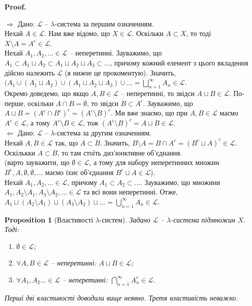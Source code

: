 \documentclass[a4paper, 10pt]{article}
\makeatletter
\def\rightproof{$\boxed{\Rightarrow}$ }
\def\leftproof{$\boxed{\Leftarrow}$ }
\theoremstyle{theoremdd}
\newtheorem{proposition}[theorem]{Proposition}
\renewenvironment{proof}[1][Proof.\\]{\par
\pushQED{\hfill \qed}%
\normalfont \topsep6\p@\@plus6\p@\relax
\trivlist
\item\relax
{\bfseries
#1\@addpunct{.}}\hspace\labelsep\ignorespaces
}{%
\popQED\endtrivlist\@endpefalse
}
\makeatother
\begin{document}
\begin{proof}
\rightproof Дано: $\mathcal{L}$ -- $\lambda$-система за першим означенням.\\
Нехай $A \in \mathcal{L}$. Нам вже відомо, що $X \in \mathcal{L}$. Оскільки $A \subset X$, то тоді $X \setminus A = A^c \in \mathcal{L}$.\\
Нехай $A_1,A_2,\dots \in \mathcal{L}$ -- неперетинні. Зауважимо, що $A_1 \subset A_1 \sqcup A_2 \subset A_1 \sqcup A_2 \sqcup A_3 \subset \dots$, причому кожний елемент з цього вкладення дійсно належить $\mathcal{L}$ (я нижче це прокоментую). Значить, $(A_1 \cup (A_1 \sqcup A_2) \cup (A_1 \sqcup A_2 \sqcup A_3) \cup \dots = \displaystyle\bigsqcup_{n=1}^\infty A_n \in \mathcal{L}$.
\bigskip \\
Окремо доведемо, що якщо $A,B \in \mathcal{L}$ -- неперетинні, то звідси $A \sqcup B \in \mathcal{L}$. По-перше, оскільки $A \cap B = \emptyset$, то звідси $B \subset A^c$. Зауважимо, що $A \sqcup B = (A^c \cap B^c)^c = (A^c \setminus B)^c$. Ми вже знаємо, що при $A,B \in \mathcal{L}$ маємо $A^c \in \mathcal{L}$, а тому $A^c \setminus B \in \mathcal{L}$, тож $(A^c \setminus B)^c = A \sqcup B \in \mathcal{L}$.
\bigskip \\
\leftproof Дано: $\mathcal{L}$ -- $\lambda$-система за другим означенням.\\
Нехай $A,B \in \mathcal{L}$ так, що $A \subset B$. Значить, $B \setminus A = B \cap A^c = (B^c \sqcup A)^c \in \mathcal{L}$. Оскількки $A \subset B$, то там стоїть диз'юнктивне об'єднання.\\ (варто зауважити, що $\emptyset \in \mathcal{L}$, а тому для набору неперетинних множин $B^c, A, \emptyset, \emptyset, \dots$ маємо їхнє об'єднання $B^c \sqcup A \in \mathcal{L}$).\\
Нехай $A_1,A_2,\dots \in \mathcal{L}$, причому $A_1 \subset A_2 \subset \dots$. Зауважимо, що множини $A_1, A_2 \setminus A_1, A_3 \setminus A_2, \dots \in \mathcal{L}$ та всі вони неперетинні. Отже, $A_1 \sqcup (A_2 \setminus A_1) \sqcup (A_3 \setminus A_2) \sqcup \dots = \displaystyle\bigcup_{n=1}^\infty A_n \in \mathcal{L}$.
\end{proof}

\begin{proposition}[Властивості $\lambda$-систем]
Задано $\mathcal{L}$ -- $\lambda$-система підмножин $X$. Тоді:
\begin{enumerate}[nosep,wide=0pt,label={\arabic*)}]
\item $\emptyset \in \mathcal{L}$;
\item $\forall A,B \in \mathcal{L}$ -- неперетинні: $A \sqcup B \in \mathcal{L}$;
\item $\forall A_1,A_2\dots \in \mathcal{L}$ -- неперетинні: $\displaystyle\bigcap_{n=1}^\infty A_n^c \in \mathcal{L}$.
\end{enumerate}
\textit{Перші дві властивості доводили вище неявно. Третя властивість неважко.}
\end{proposition}
\end{document}
